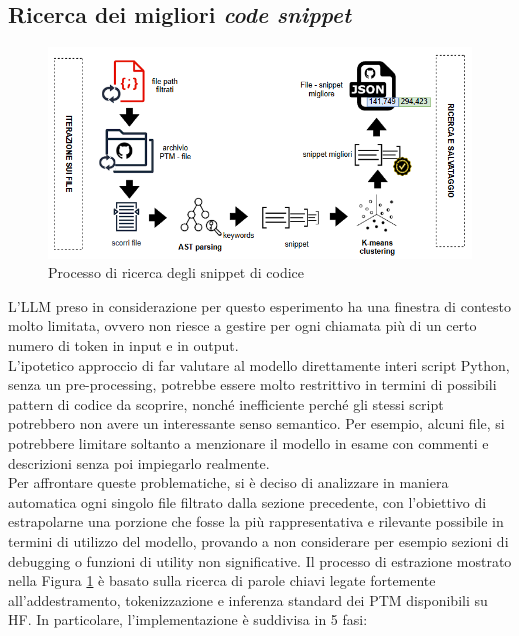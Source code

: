 \documentclass{article}
\begin{document}
\subsection{Ricerca dei migliori \textit{code snippet}}
\begin{figure}[htbp]
    \centering
    \includegraphics[width=\linewidth]{images/approccio_ricerca_snippet.png}
    \caption{Processo di ricerca degli snippet di codice}
    \label{fig:ricerca_snippet}
\end{figure}
L'LLM preso in considerazione per questo esperimento ha una finestra di contesto molto limitata, ovvero non riesce a gestire per ogni chiamata più di un certo numero di token in input e in output.\\
L'ipotetico approccio di far valutare al modello direttamente interi script Python, senza un pre-processing, potrebbe essere molto restrittivo in termini di possibili pattern di codice da scoprire, nonché inefficiente perché gli stessi script potrebbero non avere un interessante senso semantico. Per esempio, alcuni file, si potrebbere limitare soltanto a menzionare il modello in esame con commenti e descrizioni senza poi impiegarlo realmente.\\
Per affrontare queste problematiche, si è deciso di analizzare in maniera automatica ogni singolo file filtrato dalla sezione precedente, con l'obiettivo di estrapolarne una porzione che fosse la più rappresentativa e rilevante possibile in termini di utilizzo del modello, provando a non considerare per esempio sezioni di debugging o funzioni di utility non significative. Il processo di estrazione mostrato nella Figura \ref{fig:ricerca_snippet} è basato sulla ricerca di parole chiavi legate fortemente all'addestramento, tokenizzazione e inferenza standard dei PTM disponibili su HF. In particolare, l'implementazione è suddivisa in 5 fasi:\\
\end{document}
